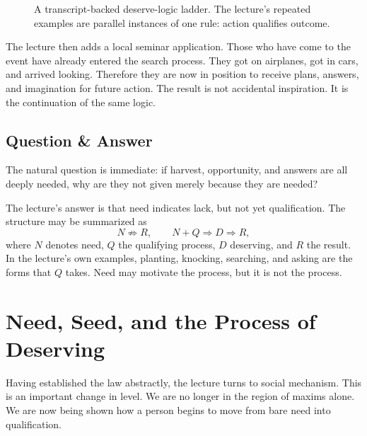 \begin{figure}[t]
\centering
{}
\caption{A transcript-backed deserve-logic ladder. The lecture's repeated examples are parallel instances of one rule: action qualifies outcome.}
\end{figure}

The lecture then adds a local seminar application. Those who have come to the event have already entered the search process. They got on airplanes, got in cars, and arrived looking. Therefore they are now in position to receive plans, answers, and imagination for future action. The result is not accidental inspiration. It is the continuation of the same logic.

\subsection{Question \& Answer}

The natural question is immediate: if harvest, opportunity, and answers are all deeply needed, why are they not given merely because they are needed?

The lecture's answer is that need indicates lack, but not yet qualification. The structure may be summarized as
\begin{equation}
N \not\Rightarrow R, \qquad N + Q \Rightarrow D \Rightarrow R,
\end{equation}
where \(N\) denotes need, \(Q\) the qualifying process, \(D\) deserving, and \(R\) the result. In the lecture's own examples, planting, knocking, searching, and asking are the forms that \(Q\) takes. Need may motivate the process, but it is not the process.

\section{Need, Seed, and the Process of Deserving}

Having established the law abstractly, the lecture turns to social mechanism. This is an important change in level. We are no longer in the region of maxims alone. We are now being shown how a person begins to move from bare need into qualification.

